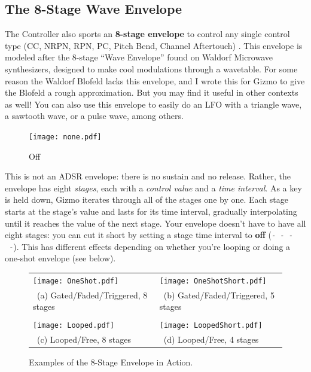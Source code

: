 \documentclass{article}
\begin{document}
\subsection{The 8-Stage Wave Envelope}
\label{waveenvelope}

The Controller also sports an {\bf 8-stage envelope} to control any single control type (CC, NRPN, RPN, PC, Pitch Bend, Channel Aftertouch)%
.  This envelope is modeled after the 8-stage ``Wave Envelope'' found on Waldorf Microwave synthesizers, designed to make cool modulations through a wavetable.  For some reason the Waldorf Blofeld lacks this envelope, and I wrote this for Gizmo to give the Blofeld a rough approximation.  But you may find it useful in other contexts as well!  You can also use this envelope to easily do an LFO with a triangle wave, a sawtooth wave, or a pulse wave, among others.

\begin{figure}
\texttt{[image: none.pdf]}
\vspace{-2em}\caption{\small Off}\vspace{-1em}
\end{figure}

 This is not an ADSR envelope: there is no sustain and no release.  Rather, the envelope has eight {\it stages}, each with a {\it control value} and a {\it time interval}.  As a key is held down, Gizmo iterates through all of the stages one by one.  Each stage starts at the stage's value and lasts for its time interval, gradually interpolating until it reaches the value of the next stage.  Your envelope doesn't have to have all eight stages: you can cut it short by setting a stage time interval to {\bf off} (\texttt{-~-~-~-}).  This has different effects depending on whether you're looping or doing a one-shot envelope (see below).


\begin{figure}[t]
\begin{center}
\begin{tabular}{@{}ll@{}}
\texttt{[image: OneShot.pdf]}&
\texttt{[image: OneShotShort.pdf]}\\
~(a) Gated/Faded/Triggered, 8 stages&
~(b) Gated/Faded/Triggered, 5 stages\\\\
\texttt{[image: Looped.pdf]}&
\texttt{[image: LoopedShort.pdf]}\\
~(c) Looped/Free, 8 stages&
~(d) Looped/Free, 4 stages
\end{tabular}
\end{center}
\caption{Examples of the 8-Stage Envelope in Action.}
\end{figure}
\end{document}
